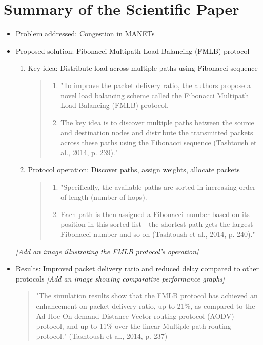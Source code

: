 \documentclass{article}
\begin{document}
\section{Summary of the Scientific Paper}
\begin{itemize}
    \item Problem addressed: Congestion in MANETs
    \item Proposed solution: Fibonacci Multipath Load Balancing (FMLB) protocol
    \begin{enumerate}[align=left]
        \item Key idea: Distribute load across multiple paths using Fibonacci sequence
        \begin{quote}
            \begin{enumerate}[label=(\arabic*)]
                \item "To improve the packet delivery ratio, the authors propose a novel load balancing scheme called the Fibonacci Multipath Load Balancing (FMLB) protocol.
                \item The key idea is to discover multiple paths between the source and destination nodes and distribute the transmitted packets across these paths using the Fibonacci sequence (Tashtoush et al., 2014, p. 239)."
            \end{enumerate}
        \end{quote}
        \item Protocol operation: Discover paths, assign weights, allocate packets
        \begin{quote}
            \begin{enumerate}[label=(\arabic*)]
                \item "Specifically, the available paths are sorted in increasing order of length (number of hops).
                \item Each path is then assigned a Fibonacci number based on its position in this sorted list - the shortest path gets the largest Fibonacci number and so on (Tashtoush et al., 2014, p. 240)."
            \end{enumerate}
        \end{quote}
    \end{enumerate}
    \textit{[Add an image illustrating the FMLB protocol's operation]}
    \item Results: Improved packet delivery ratio and reduced delay compared to other protocols
    \textit{[Add an image showing comparative performance graphs]}
    \begin{quote}
        "The simulation results show that the FMLB protocol has achieved an enhancement on packet delivery ratio, up to 21\%, as compared to the Ad Hoc On-demand Distance Vector routing protocol (AODV) protocol, and up to 11\% over the linear Multiple-path routing protocol." (Tashtoush et al., 2014, p. 237)
    \end{quote}
\end{itemize}
\end{document}
